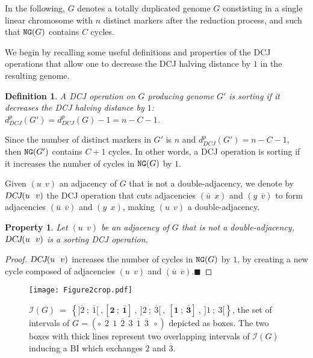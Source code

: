 \documentclass[11pt,final,twoside,nofrench]{thlifl}
\newcommand{\qed}{\ensuremath{\blacksquare}}
\newcommand{\fst}[1]{ \ensuremath{#1} }
\newcommand{\snd}[1]{ \ensuremath{\overline{#1}} }
\newcommand\oiff[2]{\ensuremath{]\fst{#1}~;~\fst{#2}[}}
\newcommand\oifs[2]{\ensuremath{]\fst{#1}~;~\snd{#2}[}}
\newcommand\oiss[2]{\ensuremath{]\snd{#1}~;~\snd{#2}[}}
\newcommand\cifs[2]{\ensuremath{[\fst{#1}~;~\snd{#2}]}}
\renewcommand{\NG}{\ensuremath{\mbox{\texttt{NG}}}}
\def\BI{\ensuremath{\mbox{BI}}}
\def\DCJ{\ensuremath{\mbox{\sl DCJ}}}
\newtheorem{property}{Property}
\newtheorem{proof}{Proof}
\newtheorem{definition}{Definition}
\begin{document}
In
the following, $G$ denotes a totally duplicated genome $G$
constisting in a single linear chromosome with $n$ distinct markers
after the reduction process, and such that $\NG(G)$ contains $C$ cycles.

We begin by recalling some useful definitions and properties of the DCJ
operations that allow one to decrease the DCJ halving distance by $1$ in the resulting genome.

\begin{definition}
A DCJ operation on $G$ producing genome $G'$ is \emph{sorting} if it decreases the DCJ halving distance by $1$: $d^p_{DCJ}(G') = d^p_{DCJ}(G)-1 = n-C-1$.
\end{definition}

Since the number of distinct markers in $G'$ is $n$ and $d^p_{DCJ}(G') = n-C-1$, then $\NG(G')$ contains $C+1$ cycles. In other words, a DCJ operation is sorting if it increases the number of cycles in  $\NG(G)$ by $1$.

Given $(\fst{u}~~\fst{v})$ an adjacency of $G$ that is not a double-adjacency,
we denote by $\DCJ(\fst{u}~~\fst{v})$ the DCJ operation that cuts adjacencies $(\snd{u}~~\fst{x})$ and  $(\fst{y}~~\snd{v})$ to form adjacencies $(\snd{u}~~\snd{v})$ and  $(\fst{y}~~\fst{x})$, making $(\fst{u}~~\fst{v})$ a double-adjacency. 

\begin{property}
Let  $(\fst{u}~~\fst{v})$ be an adjacency of $G$ that is not a double-adjacency,
 $\DCJ(\fst{u}~~\fst{v})$ is a sorting DCJ operation.
\end{property}
\begin{proof}
$\DCJ(\fst{u}~~\fst{v})$ increases the number of cycles in  $\NG(G)$ by $1$, by creating a new cycle composed of adjacencies  $(\fst{u}~~\fst{v})$ and  $(\snd{u}~~\snd{v})$.\qed
\end{proof}

 

\begin{figure}[!h]
\centering

\texttt{[image: Figure2crop.pdf]}

\caption{ $\mathcal{I}(G) ~ = ~ \left\{ \oiss{2}{1} ~,
      \mathbf{\cifs{2}{1}} ~,~ \oifs{2}{3} ~,~ \mathbf{\cifs{1}{3}}
      ~,~ \oiff{1}{3}  \right\}$, the set of intervals of $G =
  (\circ~~\fst{2}~~\fst{1}~~\snd{2}~~\fst{3}~~\snd{1}~~\snd{3}~~\circ
  )$ depicted as boxes. The two boxes with thick lines represent two 
  overlapping intervals of $\mathcal{I}(G)$ inducing a \BI\xspace which 
  exchanges $\fst{2}$ and $\snd{3}$.}
    \label{fig:intervaldef}
\end{figure}
\end{document}
